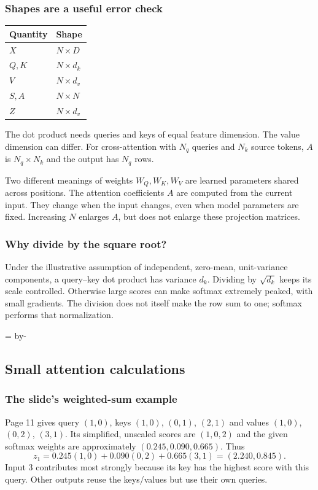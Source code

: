 \documentclass[11pt]{article}
\newcommand{\newsubsection}[1]{\par\begingroup\skip0=\pagegoal\advance\skip0 by-\pagetotal\ifdim\skip0<12\baselineskip\newpage\fi\endgroup\subsection{#1}}
\begin{document}
\subsubsection{Shapes are a useful error check}
\begin{center}
\begin{tabular}{ll}
\toprule Quantity & Shape\\\midrule
$X$ & $N\times D$\\
$Q,K$ & $N\times d_k$\\
$V$ & $N\times d_v$\\
$S,A$ & $N\times N$\\
$Z$ & $N\times d_v$\\\bottomrule
\end{tabular}
\end{center}
The dot product needs queries and keys of equal feature dimension. The value dimension can differ. For cross-attention with $N_q$ queries and $N_k$ source tokens, $A$ is $N_q\times N_k$ and the output has $N_q$ rows.

\begin{keyidea}{Two different meanings of weights}
$W_Q,W_K,W_V$ are learned parameters shared across positions. The attention coefficients $A$ are computed from the current input. They change when the input changes, even when model parameters are fixed. Increasing $N$ enlarges $A$, but does not enlarge these projection matrices.
\end{keyidea}

\subsubsection{Why divide by the square root?}
Under the illustrative assumption of independent, zero-mean, unit-variance components, a query--key dot product has variance $d_k$. Dividing by $\sqrt{d_k}$ keeps its scale controlled. Otherwise large scores can make softmax extremely peaked, with small gradients. The division does not itself make the row sum to one; softmax performs that normalization.

\newsubsection{Small attention calculations}
\subsubsection{The slide's weighted-sum example}
Page 11 gives query $(1,0)$, keys $(1,0)$, $(0,1)$, $(2,1)$ and values $(1,0)$, $(0,2)$, $(3,1)$. Its simplified, unscaled scores are $(1,0,2)$ and the given softmax weights are approximately $(0.245,0.090,0.665)$. Thus
\[
z_1=0.245(1,0)+0.090(0,2)+0.665(3,1)
   =(2.240,0.845).
\]
Input 3 contributes most strongly because its key has the highest score with this query. Other outputs reuse the keys/values but use their own queries.
\end{document}
